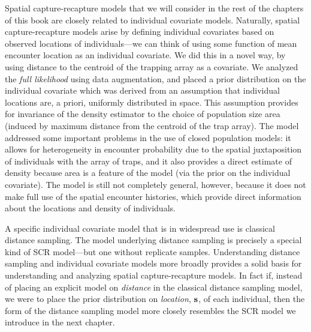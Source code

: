 Spatial capture-recapture models that we will consider in the rest of
the chapters of this book are closely related to
individual covariate models. Naturally, spatial capture-recapture
models arise by defining individual covariates based on observed
locations of individuals---we can think of using some function of
mean encounter location as an individual covariate. We did this in a
novel way, by using distance to the centroid of the trapping array as
a covariate. We analyzed the {\it full likelihood} using data
augmentation, and placed a prior distribution on the individual
covariate which was derived from an assumption that individual
locations are, a priori, uniformly distributed in space. This
assumption provides for invariance of the density estimator to the
choice of population size area (induced by maximum distance from the
centroid of the trap array). The model addressed some important problems in the
use of closed population models: it allows for heterogeneity in
encounter probability due to the spatial juxtaposition of individuals
with the array of traps, and it 
also provides a direct estimate of density because area is a feature
of the model (via the prior on the individual covariate). The model is
still not completely general, however, because it does not make full use of
the spatial encounter histories, which provide direct
information about the locations and density of individuals.  

A specific individual covariate model that is in widespread use is
classical distance sampling. The model underlying distance
sampling is precisely a special kind of SCR model---but one without
replicate samples. Understanding distance sampling and individual
covariate models more broadly provides a solid basis for understanding
and analyzing spatial capture-recapture models. In fact if, instead of
placing an explicit model on {\it distance} in the classical distance
sampling model, we were to place the prior distribution on {\it
  location}, ${\bf s}$, of each individual, then the form of the
distance sampling model more closely resembles the SCR model we
introduce in the next chapter.



